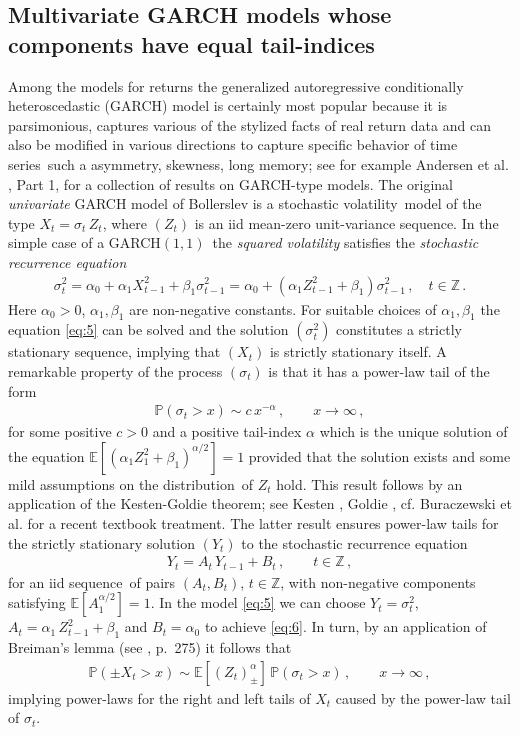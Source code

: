 \documentclass[11pt,a4]{amsart}
\newcommand{\garch}{{\rm GARCH}$(1,1)$}
\newcommand{\ts}{time series}
\newcommand{\sv}{stochastic volatility}
\newcommand{\sre}{stochastic recurrence equation}
\newcommand{\beao}{\begin{eqnarray*}}
\newcommand{\eeao}{\end{eqnarray*}\noindent}
\newcommand{\beam}{\begin{eqnarray}}
\newcommand{\eeam}{\end{eqnarray}\noindent}
\newcommand{\xto}{x\to\infty}
\newcommand{\bbz}{{\mathbb Z}}
\newcommand{\ds}{distribution}
\newcommand{\seq}{sequence}
\newcommand{\E }{{\mathbb E}}
\renewcommand{\P }{{\mathbb P}}
\newcommand{\1}{{\mathbf 1}}
\begin{document}
\subsection{Multivariate GARCH models whose components have  equal tail-indices}\label{subsec:garch}
Among the models for returns the generalized autoregressive conditionally heteroscedastic (GARCH) model
is certainly most popular because it is parsimonious, captures various of the stylized facts of real return data
and can also be modified in various directions to capture specific behavior of \ts\ such a asymmetry, skewness, long memory; 
see for example Andersen et al. \cite{andersen:davis:kreiss:mikosch:2009}, Part 1, for a collection of results
on GARCH-type models.
The original  {\em univariate} GARCH model of Bollerslev \cite{bollerslev:1986} is a \sv\ model of the type $X_t=\sigma_t\,Z_t$, where 
$(Z_t)$ is an iid mean-zero unit-variance \seq . In the simple case of a \garch\ the {\em squared volatility} satisfies the {\em \sre} 
\beam\label{eq:5}
\sigma_t^2= \alpha_0+\alpha_1 X_{t-1}^2+\beta_1\sigma_{t-1}^2=\alpha_0+(\alpha_1Z_{t-1}^2+\beta_1)\sigma_{t-1}^2\,,\quad t\in\bbz\,.
\eeam
Here $\alpha_0>0$, $\alpha_1,\beta_1$ are non-negative constants. For suitable choices of $\alpha_1,\beta_1$ the equation \eqref{eq:5}
can be solved and the solution $(\sigma_t^2)$ constitutes a strictly stationary \seq , implying that $(X_t)$ 
is strictly stationary itself. A remarkable property of the process $(\sigma_t)$ is that it has a power-law tail 
of the form
\beam\label{eq:6}
\P(\sigma_t>x)\sim c\,x^{-\alpha}\,,\qquad \xto\,,
\eeam
for some positive $c>0$ and a positive tail-index $\alpha$ which is the unique solution of the equation 
$\E [(\alpha_1 Z_1^2+\beta_1)^{\alpha/2}]=1$
provided that the solution exists and some mild assumptions on the \ds\ of $Z_t$ hold. This result
follows by an application of the Kesten-Goldie theorem; see Kesten \cite{kesten:1973}, Goldie \cite{goldie:1991}, cf. 
Buraczewski et al. \cite{buraczewski:damek:mikosch:2016} for a 
recent textbook treatment. The latter result ensures power-law tails  for
the strictly stationary  solution $(Y_t)$ to the \sre\ 
\beam\label{eq:7}
Y_t= A_t\,Y_{t-1}+B_t\,,\qquad t\in\bbz\,,
\eeam
for an iid \seq\ of pairs $(A_t,B_t)$, $t\in\bbz$, with non-negative components satisfying $\E [A_1^{\alpha/2}]=1$.  
In the model \eqref{eq:5} we can choose $Y_t=\sigma_t^2$, $A_t=\alpha_1\,Z_{t-1}^2+\beta_1$ and $B_t=\alpha_0$ to achieve
\eqref{eq:6}. In turn, by an application of Breiman's lemma (see \cite{buraczewski:damek:mikosch:2016}, p.~275)
it follows that
\beao
\P(\pm X_t>x)\sim \E[(Z_t)_\pm^\alpha]\,\P(\sigma_t>x)\,,\qquad \xto\,, 
\eeao
implying power-laws for the right and left tails of $X_t$ caused by the power-law tail of $\sigma_t$.
\end{document}
